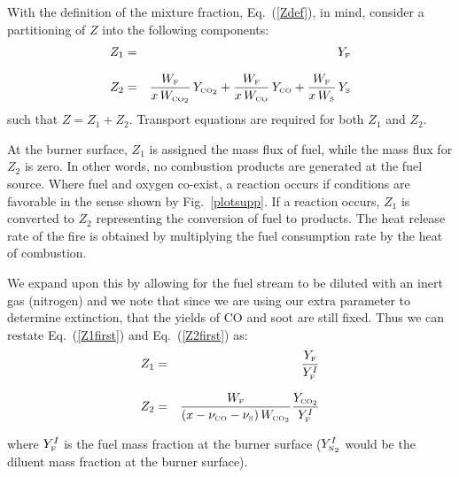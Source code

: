 \documentclass[11pt]{book}
\begin{document}
With the definition of the mixture fraction, Eq.~(\ref{Zdef}), in mind, consider a partitioning of $Z$ into the following components:
\begin{eqnarray}  Z_1 &=& Y_{\tiny \hbox{F}}  \label{Z1first}  \\*[.1in]
                  Z_2 &=& \frac{W_{\tiny \hbox{F}}}{x \, W_{\tiny \hbox{CO}_2} } \,  Y_{\tiny \hbox{CO}_2}  + \frac{W_{\tiny \hbox{F}}}{x \, W_{\tiny \hbox{CO}} } \, Y_{\tiny \hbox{CO}}  + \frac{W_{\tiny \hbox{F}}}{x \, W_{\tiny \hbox{S}} }  \label{Z2first} \, Y_{\tiny \hbox{S}}
\end{eqnarray}
such that $Z=Z_1+Z_2$. Transport equations are required for both $Z_1$ and $Z_2$. 

At the burner surface, $Z_1$ is assigned the mass flux of fuel,
while the mass flux for $Z_2$ is zero. In other words, no combustion products are generated at the fuel source. Where fuel and
oxygen co-exist, a reaction occurs if conditions are favorable in the sense shown by Fig.~\ref{plotsupp}.
If a reaction occurs, $Z_1$ is converted to $Z_2$ representing the
conversion of fuel to products. The heat release rate of the fire is obtained by multiplying the fuel consumption rate by the
heat of combustion.

We expand upon this by allowing for the fuel stream to be diluted with an inert gas (nitrogen) and we note that since we are using our extra
parameter to determine extinction, that the yields of CO and soot are still fixed.  Thus we can restate
Eq.~(\ref{Z1first}) and Eq.~(\ref{Z2first}) as:
\begin{eqnarray} Z_1 &=& \frac{Y_{\tiny \hbox{F}}}{Y_{\tiny \hbox{F}}^I} \\*[.1in]
                 Z_2 &=& \frac{W_{\tiny \hbox{F}}}{(x-\nu_{\tiny \hbox{CO}}-\nu_{\tiny \hbox{S}}) \, W_{\tiny \hbox{CO}_2} } \frac{Y_{\tiny \hbox{CO}_2}}{Y_{\tiny \hbox{F}}^I}
\end{eqnarray}

where $Y_{\tiny \hbox{F}}^I$ is the fuel mass fraction at the burner surface ($Y_{\tiny \hbox{N}_2}^I$ would be the diluent mass fraction at the
burner surface).
\end{document}

